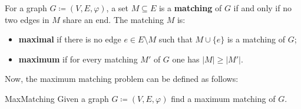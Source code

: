 \begin{definition}[Matching]
	\label{def:matching}
	For a graph \(G \coloneqq (V, E, \varphi)\), a set \(M \subseteq E\) is a \textbf{matching} of \(G\) if and only if no two edges in \(M\) share an end.
	The matching \(M\) is:
	\begin{itemize}
		\item 
			\textbf{maximal} if there is no edge \(e \in E \setminus M\) such that \(M \cup \{e\}\) is a matching of \(G\);
		\item
			\textbf{maximum} if for every matching \(M'\) of \(G\) one has \(|M| \geq |M'|\).
	\end{itemize}
\end{definition}

Now, the maximum matching problem can be defined as follows:
\\
\begin{problem}{MaxMatching}
	\label{prob:maxmatching}
	Given a graph \(G \coloneqq (V, E, \varphi)\) find a maximum matching of \(G\).
\end{problem}


